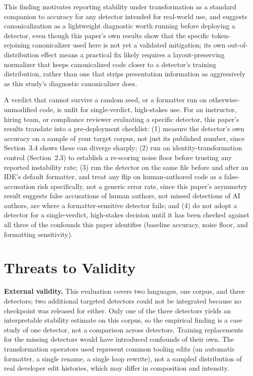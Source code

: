\documentclass[sigconf,review,anonymous]{acmart}
\begin{document}
This finding motivates reporting stability under transformation as a standard companion to accuracy for any detector intended for real-world use, and suggests canonicalization as a lightweight diagnostic worth running before deploying a detector, even though this paper's own results show that the specific token-rejoining canonicalizer used here is not yet a validated mitigation; its own out-of-distribution effect means a practical fix likely requires a layout-preserving normalizer that keeps canonicalized code closer to a detector's training distribution, rather than one that strips presentation information as aggressively as this study's diagnostic canonicalizer does.

A verdict that cannot survive a random seed, or a formatter run on otherwise-unmodified code, is unfit for single-verdict, high-stakes use. For an instructor, hiring team, or compliance reviewer evaluating a specific detector, this paper's results translate into a pre-deployment checklist: (1) measure the detector's own accuracy on a sample of your target corpus, not just its published number, since Section~3.4 shows these can diverge sharply; (2) run an identity-transformation control (Section~2.3) to establish a re-scoring noise floor before trusting any reported instability rate; (3) run the detector on the same file before and after an IDE's default formatter, and treat any flip on human-authored code as a false-accusation risk specifically, not a generic error rate, since this paper's asymmetry result suggests false accusations of human authors, not missed detections of AI authors, are where a formatter-sensitive detector fails; and (4) do not adopt a detector for a single-verdict, high-stakes decision until it has been checked against all three of the confounds this paper identifies (baseline accuracy, noise floor, and formatting sensitivity).

\section{Threats to Validity}

\textbf{External validity.} This evaluation covers two languages, one corpus, and three detectors; two additional targeted detectors could not be integrated because no checkpoint was released for either. Only one of the three detectors yields an interpretable stability estimate on this corpus, so the empirical finding is a case study of one detector, not a comparison across detectors. Training replacements for the missing detectors would have introduced confounds of their own. The transformation operators used represent common tooling edits (an automatic formatter, a single rename, a single loop rewrite), not a sampled distribution of real developer edit histories, which may differ in composition and intensity.
\end{document}
